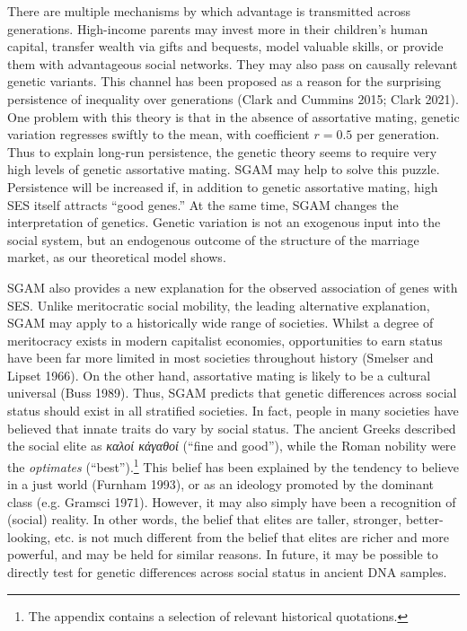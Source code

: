 \documentclass[
]{article}
\begin{document}
There are multiple mechanisms by which advantage is transmitted across
generations. High-income parents may invest more in their children's human
capital, transfer wealth via gifts and bequests, model valuable skills, or
provide them with advantageous social networks. They may also pass on causally
relevant genetic variants. This channel has been proposed as a reason for the
surprising persistence of inequality over generations
(Clark and Cummins 2015; Clark 2021). One problem with this theory is
that in the absence of assortative mating, genetic variation regresses swiftly
to the mean, with coefficient \(r = 0.5\) per generation. Thus to explain long-run
persistence, the genetic theory seems to require very high levels of genetic
assortative mating. SGAM may help to solve this puzzle. Persistence will be
increased if, in addition to genetic assortative mating, high SES itself
attracts ``good genes.'' At the same time, SGAM changes the interpretation of
genetics. Genetic variation is not an exogenous input into the social system,
but an endogenous outcome of the structure of the marriage market, as our
theoretical model shows.

SGAM also provides a new explanation for the observed association of genes with
SES. Unlike meritocratic social mobility, the leading alternative explanation,
SGAM may apply to a historically wide range of societies. Whilst a
degree of meritocracy exists in modern capitalist economies, opportunities to
earn status have been far more limited in most societies throughout history
(Smelser and Lipset 1966). On the other hand, assortative mating is likely to be a
cultural universal (Buss 1989). Thus, SGAM predicts that genetic differences
across social status should exist in all stratified societies. In fact, people
in many societies have believed that innate traits do vary by social
status. The ancient Greeks described the social elite as \emph{καλοί κἀγαθοί} (``fine
and good''), while the Roman nobility were the \emph{optimates} (``best'').\footnote{The appendix contains a selection of relevant historical
  quotations.} This
belief has been explained by the tendency to believe in a just world
(Furnham 1993), or as an ideology promoted by the dominant class (e.g. Gramsci 1971). However, it may also simply have been a recognition of
(social) reality. In other words, the belief that elites are taller, stronger,
better-looking, etc. is not much different from the belief that elites are
richer and more powerful, and may be held for similar reasons. In future, it
may be possible to directly test for genetic differences across social status
in ancient DNA samples.
\end{document}
